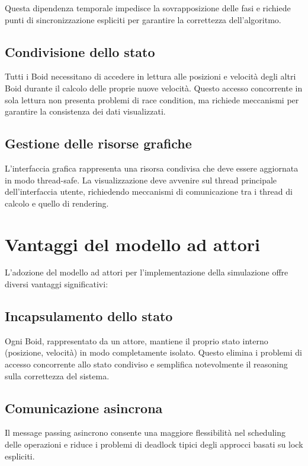 \documentclass[a4paper,12pt]{report}
\begin{document}
            Questa dipendenza temporale impedisce la sovrapposizione delle fasi e richiede punti di sincronizzazione 
            espliciti per garantire la correttezza dell'algoritmo.

        \subsection*{Condivisione dello stato}
            Tutti i Boid necessitano di accedere in lettura alle posizioni e velocità degli altri Boid durante il calcolo 
            delle proprie nuove velocità. Questo accesso concorrente in sola lettura non presenta problemi di race condition, 
            ma richiede meccanismi per garantire la consistenza dei dati visualizzati.

        \subsection*{Gestione delle risorse grafiche}
            L'interfaccia grafica rappresenta una risorsa condivisa che deve essere aggiornata in modo thread-safe. 
            La visualizzazione deve avvenire sul thread principale dell'interfaccia utente, richiedendo meccanismi 
            di comunicazione tra i thread di calcolo e quello di rendering.

    \section{Vantaggi del modello ad attori}
        L'adozione del modello ad attori per l'implementazione della simulazione offre diversi vantaggi significativi:

        \subsection*{Incapsulamento dello stato}
            Ogni Boid, rappresentato da un attore, mantiene il proprio stato interno (posizione, velocità) in modo 
            completamente isolato. Questo elimina i problemi di accesso concorrente allo stato condiviso e semplifica 
            notevolmente il reasoning sulla correttezza del sistema.

        \subsection*{Comunicazione asincrona}
            Il message passing asincrono consente una maggiore flessibilità nel scheduling delle operazioni e riduce 
            i problemi di deadlock tipici degli approcci basati su lock espliciti.
\end{document}
